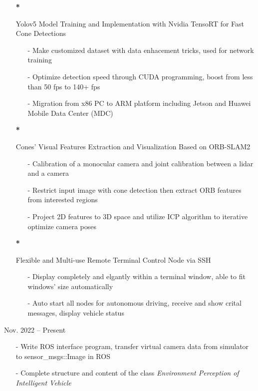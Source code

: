 \documentclass{resume}
\begin{document}
\begin{itemize}
  \item[\textbf{*}]{
    Yolov5 Model Training and Implementation with Nvidia TensoRT for Fast Cone Detections 
    \begin{itemize}
      \item[-] Make customized dataset with data enhacement tricks, used for network training
      \item[-] Optimize detection speed through CUDA programming, boost from less than 50 fps to 140+ fps
      \item[-] Migration from x86 PC to ARM platform including Jetson and Huawei Mobile Data Center (MDC)
    \end{itemize}
  }
  \item[\textbf{*}]{
    Cones' Visual Features Extraction and Visualization Based on ORB-SLAM2
    \begin{itemize}
      \item[-] Calibration of a monocular camera and joint calibration between a lidar and a camera
      \item[-] Restrict input image with cone detection then extract ORB features from interested regions
      \item[-] Project 2D features to 3D space and utilize ICP algorithm to iterative optimize camera poses
    \end{itemize}
  }
  \item[\textbf{*}]{
    Flexible and Multi-use Remote Terminal Control Node via SSH
    \begin{itemize}
      \item[-] Display completely and elgantly within a terminal window, able to fit windows' size automatically
      \item[-] Auto start all nodes for autonomous driving, receive and show crital messages, display vehicle status
    \end{itemize}
  }
\end{itemize}


 {Nov. 2022 -- Present}
\begin{itemize}
    \item[-]  Write ROS interface program, transfer virtual camera data from simulator to sensor\_msgs::Image in ROS
    \item[-]  Complete structure and content of the class \textit{Environment Perception of Intelligent Vehicle}
\end{itemize}
\end{document}
